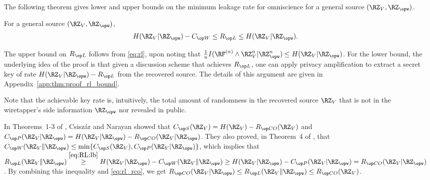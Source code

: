 The following theorem gives lower and upper bounds on the minimum leakage rate for omniscience for a general source $(\RZ_V,\RZ_{\opw})$. 

\begin{theorem}\label{thm:RL:lb}
    For a general source $(\RZ_V,\RZ_{\opw})$,
      \begin{align}
      H(\RZ_V|\RZ_{\opw}) - \wskc \leq \rl \leq H(\RZ_V|\RZ_{\opw}).\label{eq:RL:lb}
        \end{align}
\end{theorem}
 \begin{IEEEproof}
The upper bound on $\rl$ follows from \eqref{eq:rl}, upon noting that  $\frac{1}{n}I(\RF^{(n)} \wedge \RZ_V^n|\RZ_{\opw}^n)\leq H(\RZ_V|\RZ_{\opw})$. 
%
For the lower bound, the underlying idea of the proof is that given a discussion scheme that achieves $\rl$, one can apply privacy amplification to extract a secret key of rate $H(\RZ_V|\RZ_{\opw})-\rl$ from the recovered source. The details of this argument are given in Appendix~\ref{app:thm:proof_rl_bound}.
\end{IEEEproof}



\begin{remark}\renewcommand{\qed}{}
Note that the achievable key rate is, intuitively, the total amount of randomness in the recovered source $\RZ_V$ that is not in the wiretapper's side information $\RZ_{\opw}$ nor revealed in public. 
\end{remark}


In Theorems~1-3 of \cite{csiszar04}, Csisz\'ar and Narayan showed that $\skc(\RZ_V)=H(\RZ_V)-\rco(\RZ_V)$ and $ \pkc(\RZ_V | \RZ_{\opw}) = H(\RZ_V|\RZ_{\opw}) - \rco(\RZ_V|\RZ_{\opw})$. They also proved, in Theorem~4 of \cite{csiszar04}, that $\wskc(\RZ_V \| \RZ_{\opw}) \leq \min\{\skc(\RZ_V),\pkc(\RZ_V | \RZ_{\opw})\}$, which implies that $\rl(\RZ_V \| \RZ_{\opw}) \stackrel{\eqref{eq:RL:lb}}{\geq} H(\RZ_V|\RZ_{\opw}) - \wskc (\RZ_V \| \RZ_{\opw}) \geq H(\RZ_V|\RZ_{\opw}) - \pkc (\RZ_V | \RZ_{\opw})=\rco(\RZ_V|\RZ_{\opw})$. By combining this inequality and \eqref{eq:rl_rco}, we get
$\rco(\RZ_V|\RZ_{\opw})\leq \rl(\RZ_V \| \RZ_{\opw}) \leq \rco(\RZ_V)$.




